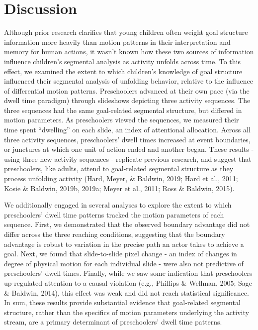 \documentclass[
  english,
  man,floatsintext]{apa6}
\begin{document}
\hypertarget{discussion}{%
\section{Discussion}\label{discussion}}

Although prior research clarifies that young children often weight goal structure information more heavily than motion patterns in their interpretation and memory for human actions, it wasn't known how these two sources of information influence children's segmental analysis as activity unfolds across time. To this effect, we examined the extent to which children's knowledge of goal structure influenced their segmental analysis of unfolding behavior, relative to the influence of differential motion patterns. Preschoolers advanced at their own pace (via the dwell time paradigm) through slideshows depicting three activity sequences. The three sequences had the same goal-related segmental structure, but differed in motion parameters. As preschoolers viewed the sequences, we measured their time spent ``dwelling'' on each slide, an index of attentional allocation. Across all three activity sequences, preschoolers' dwell times increased at event boundaries, or junctures at which one unit of action ended and another began. These results - using three new activity sequences - replicate previous research, and suggest that preschoolers, like adults, attend to goal-related segmental structure as they process unfolding activity (Hard, Meyer, \& Baldwin, 2019; Hard et al., 2011; Kosie \& Baldwin, 2019b, 2019a; Meyer et al., 2011; Ross \& Baldwin, 2015).

We additionally engaged in several analyses to explore the extent to which preschoolers' dwell time patterns tracked the motion parameters of each sequence. First, we demonstrated that the observed boundary advantage did not differ across the three reaching conditions, suggesting that the boundary advantage is robust to variation in the precise path an actor takes to achieve a goal. Next, we found that slide-to-slide pixel change - an index of changes in degree of physical motion for each individual slide - were also not predictive of preschoolers' dwell times. Finally, while we saw some indication that preschoolers up-regulated attention to a causal violation (e.g., Phillips \& Wellman, 2005; Sage \& Baldwin, 2014), this effect was weak and did not reach statistical significance. In sum, these results provide substantial evidence that goal-related segmental structure, rather than the specifics of motion parameters underlying the activity stream, are a primary determinant of preschoolers' dwell time patterns.
\end{document}
